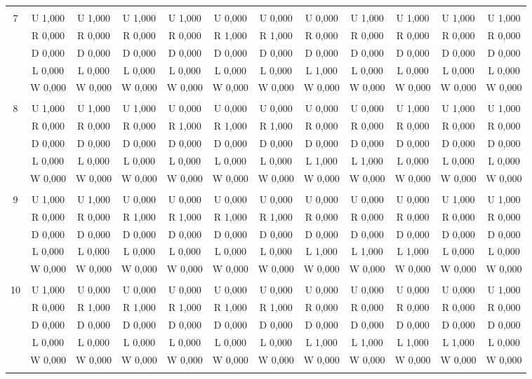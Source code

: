 \begin{table}[htbp]
\begin{footnotesize}
\begin{tabular}{c|c|c|c|c|c|c|c|c|c|c|c|}
\hline \\
7&U 1,000&U 1,000&U 1,000&U 1,000&U 0,000&U 0,000&U 0,000&U 1,000&U 1,000&U 1,000&U 1,000\\
&R 0,000&R 0,000&R 0,000&R 0,000&R 1,000&R 1,000&R 0,000&R 0,000&R 0,000&R 0,000&R 0,000\\
&D 0,000&D 0,000&D 0,000&D 0,000&D 0,000&D 0,000&D 0,000&D 0,000&D 0,000&D 0,000&D 0,000\\
&L 0,000&L 0,000&L 0,000&L 0,000&L 0,000&L 0,000&L 1,000&L 0,000&L 0,000&L 0,000&L 0,000\\
&W 0,000&W 0,000&W 0,000&W 0,000&W 0,000&W 0,000&W 0,000&W 0,000&W 0,000&W 0,000&W 0,000\\
\hline \\
8&U 1,000&U 1,000&U 1,000&U 0,000&U 0,000&U 0,000&U 0,000&U 0,000&U 1,000&U 1,000&U 1,000\\
&R 0,000&R 0,000&R 0,000&R 1,000&R 1,000&R 1,000&R 0,000&R 0,000&R 0,000&R 0,000&R 0,000\\
&D 0,000&D 0,000&D 0,000&D 0,000&D 0,000&D 0,000&D 0,000&D 0,000&D 0,000&D 0,000&D 0,000\\
&L 0,000&L 0,000&L 0,000&L 0,000&L 0,000&L 0,000&L 1,000&L 1,000&L 0,000&L 0,000&L 0,000\\
&W 0,000&W 0,000&W 0,000&W 0,000&W 0,000&W 0,000&W 0,000&W 0,000&W 0,000&W 0,000&W 0,000\\
\hline \\
9&U 1,000&U 1,000&U 0,000&U 0,000&U 0,000&U 0,000&U 0,000&U 0,000&U 0,000&U 1,000&U 1,000\\
&R 0,000&R 0,000&R 1,000&R 1,000&R 1,000&R 1,000&R 0,000&R 0,000&R 0,000&R 0,000&R 0,000\\
&D 0,000&D 0,000&D 0,000&D 0,000&D 0,000&D 0,000&D 0,000&D 0,000&D 0,000&D 0,000&D 0,000\\
&L 0,000&L 0,000&L 0,000&L 0,000&L 0,000&L 0,000&L 1,000&L 1,000&L 1,000&L 0,000&L 0,000\\
&W 0,000&W 0,000&W 0,000&W 0,000&W 0,000&W 0,000&W 0,000&W 0,000&W 0,000&W 0,000&W 0,000\\
\hline \\
10&U 1,000&U 0,000&U 0,000&U 0,000&U 0,000&U 0,000&U 0,000&U 0,000&U 0,000&U 0,000&U 1,000\\
&R 0,000&R 1,000&R 1,000&R 1,000&R 1,000&R 1,000&R 0,000&R 0,000&R 0,000&R 0,000&R 0,000\\
&D 0,000&D 0,000&D 0,000&D 0,000&D 0,000&D 0,000&D 0,000&D 0,000&D 0,000&D 0,000&D 0,000\\
&L 0,000&L 0,000&L 0,000&L 0,000&L 0,000&L 0,000&L 1,000&L 1,000&L 1,000&L 1,000&L 0,000\\
&W 0,000&W 0,000&W 0,000&W 0,000&W 0,000&W 0,000&W 0,000&W 0,000&W 0,000&W 0,000&W 0,000\\
\hline \\
\end{tabular}
\end{footnotesize}
\end{table}